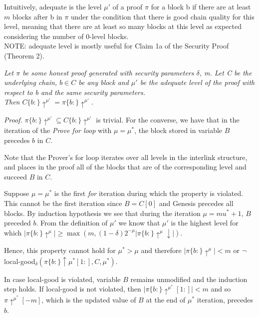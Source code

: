 Intuitively, adequate is the level $\mu'$ of a proof $\pi$ for a block b
if there are at least $m$ blocks after b in $\pi$ under the condition that there
is good chain quality for this level, meaning that there are at least so many blocks
at this level as expected considering the number of 0-level blocks.\\
NOTE: adequate level is mostly useful for Claim 1a of the Security Proof (Theorem 2).\\

\begin{lemma}
	\textit{Let $\pi$ be some honest proof generated with security
	parameters $\delta$, m. Let C be the underlying chain, $b \in C$ be any block
	and $\mu'$ be the adequate level of the proof with respect to b and the same
	security parameters.\\Then $C\{b:\}\uparrow^{\mu'} = \pi\{b:\}\uparrow^{\mu'}$.}
	\label{lemm:complete_adequate}
\end{lemma}
\textit{Proof.} $ \pi\{b:\}\uparrow^{\mu'} \subseteq C\{b:\}\uparrow^{\mu'}$ is
trivial. For the converse, we have that in the iteration of the \emph{Prove for
loop}\cite{NIPoPoWs} with $\mu = \mu^*$, the block stored in variable $B$
precedes $b$ in $C$.

Note that the Prover's for loop iterates over all levels in the interlink structure,
and places in the proof all of the blocks that are of the corresponding level and succeed $B$ in $C$.

Suppose $\mu = \mu^*$ is the first \emph{for} iteration during which the property
is violated. This cannot be the first iteration since $B = C[0]$ and Genesis
precedes all blocks. By induction hypothesis we see that during the iteration
$\mu = mu^* + 1$, $B$ preceded $b$. From the definition of $\mu'$ we know that
$\mu'$ is the highest level for which $\vert \pi\{b:\}\uparrow^{\mu} \vert
\geq \max( m, (1-\delta)2^{-\mu} \vert \pi\{b:\}\uparrow^{\mu}\downarrow \vert ) $.

Hence, this property cannot hold for $\mu^* > \mu$ and therefore $\vert
\pi\{b:\}\uparrow^{\mu} \vert < m$ or $\neg$local-good$_\delta(\pi\{b:
\}\uparrow \mu^*[1:], C, \mu^*)$.

In case local-good is violated, variable $B$ remains unmodified and the induction
step holds. If local-good is not violated, then $ \vert \pi\{b:\} \uparrow^{\mu^*}[1:]
\vert < m$ and so $\pi\uparrow^{\mu^*}[-m]$, which is the updated value of $B$ at the
end of $\mu^*$ iteration, precedes $b$.\\

